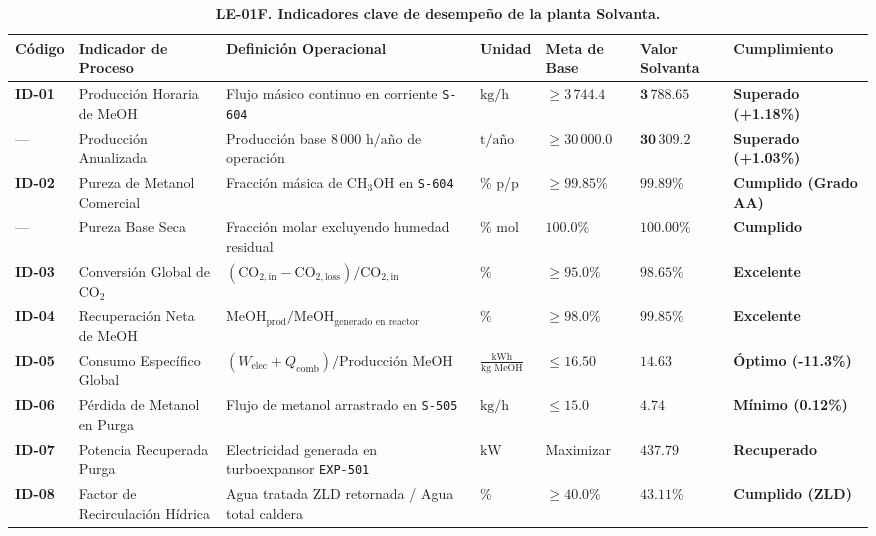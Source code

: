 \documentclass[10pt,letterpaper]{article}
\begin{document}
\begin{table}[H]
\centering
\small
\setlength{\tabcolsep}{3pt}
\caption{\textbf{LE-01F. Indicadores clave de desempeño de la planta Solvanta.}} \label{tab:cuadro9}
\begin{tabularx}{\textwidth}{>{\centering\arraybackslash}p{1.1cm} >{\raggedright\arraybackslash}p{3.2cm} >{\raggedright\arraybackslash}X >{\centering\arraybackslash}p{1.1cm} >{\centering\arraybackslash}p{1.4cm} >{\centering\arraybackslash}p{1.5cm} >{\centering\arraybackslash}p{2.3cm}}
\toprule
\textbf{Código} & \textbf{Indicador de Proceso} & \textbf{Definición Operacional} & \textbf{Unidad} & \textbf{Meta de Base} & \textbf{Valor Solvanta} & \textbf{Cumplimiento} \\
\midrule
\textbf{ID-01} & Producción Horaria de MeOH & Flujo másico continuo en corriente \texttt{S-604} & $\text{kg/h}$ & $\ge 3\,744.4$ & $\mathbf{3\,788.65}$ & \textbf{Superado (+1.18\%)} \\
--- & Producción Anualizada & Producción base $8\,000\text{ h/año}$ de operación & $\text{t/año}$ & $\ge 30\,000.0$ & $\mathbf{30\,309.2}$ & \textbf{Superado (+1.03\%)} \\
\textbf{ID-02} & Pureza de Metanol Comercial & Fracción másica de $\text{CH}_3\text{OH}$ en \texttt{S-604} & $\%$ p/p & $\ge 99.85\%$ & $\mathbf{99.89\%}$ & \textbf{Cumplido (Grado AA)} \\
--- & Pureza Base Seca & Fracción molar excluyendo humedad residual & $\%$ mol & $100.0\%$ & $\mathbf{100.00\%}$ & \textbf{Cumplido} \\
\textbf{ID-03} & Conversión Global de $\text{CO}_2$ & $(\text{CO}_{2,\text{in}} - \text{CO}_{2,\text{loss}})/\text{CO}_{2,\text{in}}$ & $\%$ & $\ge 95.0\%$ & $\mathbf{98.65\%}$ & \textbf{Excelente} \\
\textbf{ID-04} & Recuperación Neta de MeOH & $\text{MeOH}_{\text{prod}} / \text{MeOH}_{\text{generado en reactor}}$ & $\%$ & $\ge 98.0\%$ & $\mathbf{99.85\%}$ & \textbf{Excelente} \\
\textbf{ID-05} & Consumo Específico Global & $(W_{\text{elec}} + Q_{\text{comb}})/\text{Producción MeOH}$ & $\frac{\text{kWh}}{\text{kg MeOH}}$ & $\le 16.50$ & $\mathbf{14.63}$ & \textbf{Óptimo (-11.3\%)} \\
\textbf{ID-06} & Pérdida de Metanol en Purga & Flujo de metanol arrastrado en \texttt{S-505} & $\text{kg/h}$ & $\le 15.0$ & $\mathbf{4.74}$ & \textbf{Mínimo (0.12\%)} \\
\textbf{ID-07} & Potencia Recuperada Purga & Electricidad generada en turboexpansor \texttt{EXP-501} & $\text{kW}$ & Maximizar & $\mathbf{437.79}$ & \textbf{Recuperado} \\
\textbf{ID-08} & Factor de Recirculación Hídrica & Agua tratada ZLD retornada / Agua total caldera & $\%$ & $\ge 40.0\%$ & $\mathbf{43.11\%}$ & \textbf{Cumplido (ZLD)} \\
\bottomrule
\end{tabularx}
\end{table}
\end{document}
